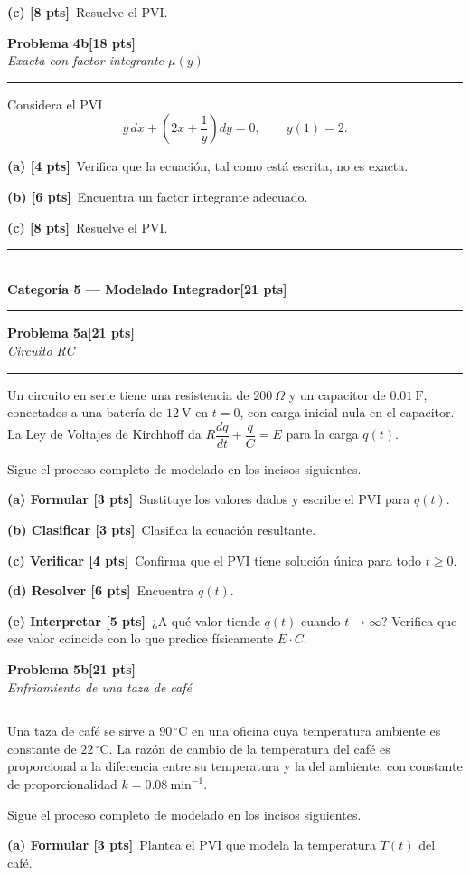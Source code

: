 \documentclass[11pt,letterpaper]{article}
\newcommand{\categoria}[3]{%
  \bigskip\bigskip\noindent
  \rule{\linewidth}{0.8pt}\\[2pt]
  {\Large\bfseries Categoría #1 --- #2}\hfill\textbf{[#3 pts]}\\[2pt]
  \rule{\linewidth}{0.8pt}\vspace{4pt}
}
\newcommand{\problema}[3]{%
  \bigskip\noindent
  {\large\textbf{Problema #1}}\hfill\textbf{[#2 pts]}\\[3pt]
  {\small\itshape #3}\par
  \vspace{2pt}\hrule\vspace{8pt}
}
\newcommand{\subparte}[2]{%
  \medskip\noindent\textbf{(#1}\ #2\par
}
\begin{document}
\subparte{c) [8 pts]}{Resuelve el PVI.}

\problema{4b}{18}{Exacta con factor integrante $\mu(y)$}

Considera el PVI
\[
y\,dx + \left(2x+\frac{1}{y}\right) dy = 0, \qquad y(1)=2.
\]

\subparte{a) [4 pts]}{Verifica que la ecuación, tal como está escrita, no es exacta.}

\subparte{b) [6 pts]}{Encuentra un factor integrante adecuado.}

\subparte{c) [8 pts]}{Resuelve el PVI.}

\newpage
\categoria{5}{Modelado Integrador}{21}

\problema{5a}{21}{Circuito RC}

Un circuito en serie tiene una resistencia de $200\ \Omega$ y un capacitor de $0.01\ \text{F}$, conectados a una batería de $12\ \text{V}$ en $t=0$, con carga inicial nula en el capacitor. La Ley de Voltajes de Kirchhoff da $R\dfrac{dq}{dt} + \dfrac{q}{C} = E$ para la carga $q(t)$.

Sigue el proceso completo de modelado en los incisos siguientes.

\subparte{a) Formular [3 pts]}{Sustituye los valores dados y escribe el PVI para $q(t)$.}

\subparte{b) Clasificar [3 pts]}{Clasifica la ecuación resultante.}

\subparte{c) Verificar [4 pts]}{Confirma que el PVI tiene solución única para todo $t\ge0$.}

\subparte{d) Resolver [6 pts]}{Encuentra $q(t)$.}

\subparte{e) Interpretar [5 pts]}{¿A qué valor tiende $q(t)$ cuando $t\to\infty$? Verifica que ese valor coincide con lo que predice físicamente $E \cdot C$.}

\problema{5b}{21}{Enfriamiento de una taza de café}

Una taza de café se sirve a $90\,^\circ\text{C}$ en una oficina cuya temperatura ambiente es constante de $22\,^\circ\text{C}$. La razón de cambio de la temperatura del café es proporcional a la diferencia entre su temperatura y la del ambiente, con constante de proporcionalidad $k = 0.08\ \text{min}^{-1}$.

Sigue el proceso completo de modelado en los incisos siguientes.

\subparte{a) Formular [3 pts]}{Plantea el PVI que modela la temperatura $T(t)$ del café.}
\end{document}
